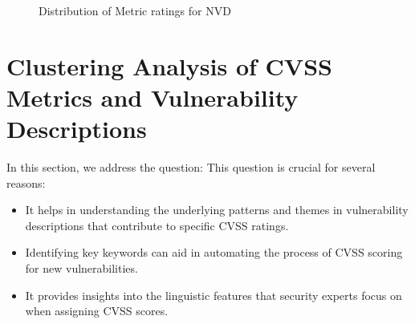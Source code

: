 





\begin{figure}
	\begin{center}
	\end{center}
	\caption{\label{fig:nvd_data}Distribution of Metric ratings for NVD}
\end{figure}


\section{Clustering Analysis of CVSS Metrics and Vulnerability Descriptions} \label{sec:important_keywords}

In this section, we address the question:  This question is crucial for several reasons:

\begin{itemize}
	\item It helps in understanding the underlying patterns and themes in vulnerability descriptions that contribute to specific CVSS ratings.
	\item Identifying key keywords can aid in automating the process of CVSS scoring for new vulnerabilities.
	\item It provides insights into the linguistic features that security experts focus on when assigning CVSS scores.
\end{itemize}


